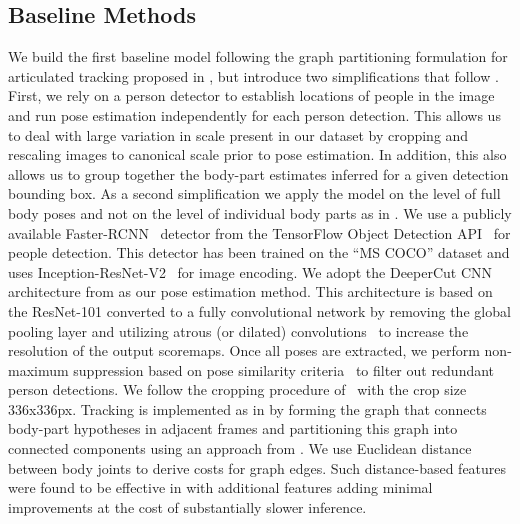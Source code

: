 \documentclass[10pt,twocolumn,letterpaper]{article}
\begin{document}
\subsection{Baseline Methods}
\label{sec:baseline_methods}

We build the first baseline model following the graph partitioning
formulation for articulated tracking proposed in
\cite{insafutdinov17cvpr}, but introduce two
simplifications that follow \cite{papandreou17arxiv}. First, we rely on
a person detector to establish locations of people in the image and
run pose estimation independently for each person detection. This
allows us to deal with large variation in scale present in our dataset by
cropping and rescaling images to canonical scale prior to pose
estimation. In addition, this also allows us to group together the
body-part estimates inferred for a given detection bounding box. As a
second simplification we apply the model on the level of full body
poses and not on the level of individual body parts as in
\cite{insafutdinov17cvpr,Iqbal:2017:CVPR}. We use a publicly available Faster-RCNN~\cite{ren2015faster} detector from the
TensorFlow Object Detection API~\cite{huang2016speed} for people detection. This detector has been trained on the ``MS COCO'' dataset and uses Inception-ResNet-V2~\cite{szegedy2017inception} for image encoding.
We adopt the DeeperCut CNN architecture from \cite{insafutdinov16eccv} as our
pose estimation method. This architecture is based on the ResNet-101 converted
to a fully convolutional network by removing the global pooling layer and
utilizing atrous (or dilated) convolutions~\cite{chen2016deeplab} to increase
the resolution of the output scoremaps. Once all poses are extracted, we perform
non-maximum suppression based on pose similarity
criteria~\cite{papandreou17arxiv} to filter out redundant person detections.  We
follow the cropping procedure of~\cite{papandreou17arxiv} with the crop size
336x336px. Tracking is implemented as in \cite{insafutdinov17cvpr} by forming
the graph that connects body-part hypotheses in adjacent frames and partitioning
this graph into connected components using an approach from
\cite{Levinkov_2017_CVPR}. We use Euclidean distance between body joints to
derive costs for graph edges. Such distance-based features were found to be
effective in \cite{insafutdinov17cvpr} with additional features adding minimal
improvements at the cost of substantially slower inference.
\end{document}
